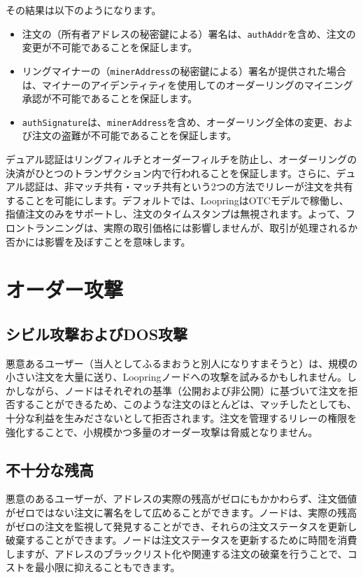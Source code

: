 \documentclass{article}
\begin{document}
\begin{multicols}{2}
\begin{enumerate}
\end{enumerate}

その結果は以下のようになります。

\begin{itemize}

	\item  注文の（所有者アドレスの秘密鍵による）署名は、\verb|authAddr|を含め、注文の変更が不可能であることを保証します。
	\item  リングマイナーの（\verb|minerAddress|の秘密鍵による）署名が提供された場合は、マイナーのアイデンティティを使用してのオーダーリングのマイニング承認が不可能であることを保証します。
	\item  \verb|authSignature|は、\verb|minerAddress|を含め、オーダーリング全体の変更、および注文の盗難が不可能であることを保証します。

\end{itemize}

デュアル認証はリングフィルチとオーダーフィルチを防止し、オーダーリングの決済がひとつのトランザクション内で行われることを保証します。さらに、デュアル認証は、非マッチ共有・マッチ共有という2つの方法でリレーが注文を共有することを可能にします。デフォルトでは、LoopringはOTCモデルで稼働し、指値注文のみをサポートし、注文のタイムスタンプは無視されます。よって、フロントランニングは、実際の取引価格には影響しませんが、取引が処理されるか否かには影響を及ぼすことを意味します。

\section{オーダー攻撃}

\subsection{シビル攻撃およびDOS攻撃}
悪意あるユーザー（当人としてふるまおうと別人になりすまそうと）は、規模の小さい注文を大量に送り、Loopringノードへの攻撃を試みるかもしれません。しかしながら、ノードはそれぞれの基準（公開および非公開）に基づいて注文を拒否することができるため、このような注文のほとんどは、マッチしたとしても、十分な利益を生みださないとして拒否されます。注文を管理するリレーの権限を強化することで、小規模かつ多量のオーダー攻撃は脅威となりません。

\subsection{不十分な残高}
悪意のあるユーザーが、アドレスの実際の残高がゼロにもかかわらず、注文価値がゼロではない注文に署名をして広めることができます。ノードは、実際の残高がゼロの注文を監視して発見することができ、それらの注文ステータスを更新し破棄することができます。ノードは注文ステータスを更新するために時間を消費しますが、アドレスのブラックリスト化や関連する注文の破棄を行うことで、コストを最小限に抑えることもできます。


\end{multicols}
\end{document}
